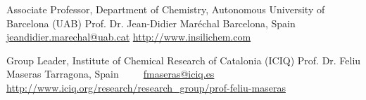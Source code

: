 


\begin{cventries}

    \cventry
        {Associate Professor, Department of Chemistry, Autonomous University of Barcelona (UAB)}
        {Prof. Dr. Jean-Didier Maréchal}
        {Barcelona, Spain} %
        {~} %
        {~~ \footnotesize{%
            \href{mailto:jeandidier.marechal@uab.cat}{\faEnvelope\acvHeaderIconSep jeandidier.marechal@uab.cat}\acvHeaderSocialSep%
            \href{http://www.insilichem.com}{\faGlobe\acvHeaderIconSep http://www.insilichem.com}%
        }}

    \cventry
        {Group Leader, Institute of Chemical Research of Catalonia (ICIQ)}
        {Prof. Dr. Feliu Maseras}
        {Tarragona, Spain} %
        {~} %
        {~~ \footnotesize{%
            \href{mailto:fmaseras@iciq.es}{\faEnvelope\acvHeaderIconSep fmaseras@iciq.es}\acvHeaderSocialSep%
            \href{http://www.iciq.org/research/research_group/prof-feliu-maseras/}{\faGlobe\acvHeaderIconSep http://www.iciq.org/research/research\_group/prof-feliu-maseras}
        }}

\end{cventries}
